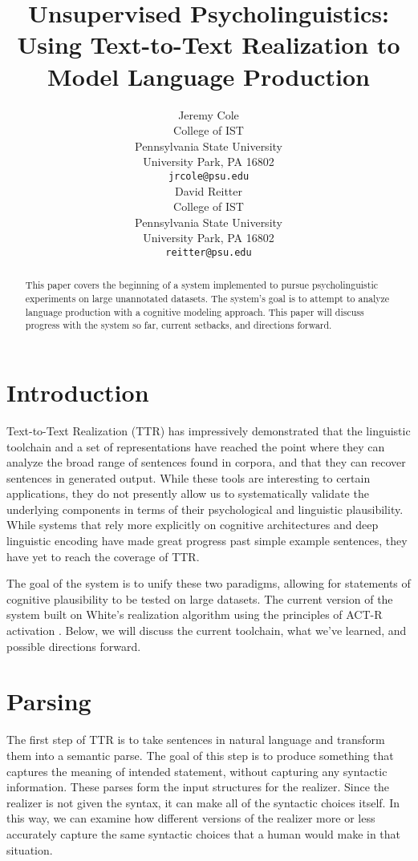 \documentclass[11pt]{article}
\title{Unsupervised Psycholinguistics: Using Text-to-Text Realization to Model Language Production}
\author{Jeremy Cole \\
  College of IST \\
  Pennsylvania State University \\
  University Park, PA 16802 \\ 
  {\tt jrcole@psu.edu} \\\And
  David Reitter \\
  College of IST \\
  Pennsylvania State University \\
  University Park, PA 16802 \\
  {\tt reitter@psu.edu} \\}
\date{}
\begin{document}
\maketitle
\begin{abstract}
This paper covers the beginning of a system implemented to pursue psycholinguistic experiments on large unannotated datasets. The system's goal is to attempt to analyze language production with a cognitive modeling approach. This paper will discuss progress with the system so far, current setbacks, and directions forward.
\end{abstract}

\section{Introduction}
Text-to-Text Realization (TTR) has impressively demonstrated that the linguistic toolchain and a set of representations have reached the point where they can analyze the broad range of sentences found in corpora, and that they can recover sentences in generated output. While these tools are interesting to certain applications, they do not presently allow us to systematically validate the underlying components in terms of their psychological and linguistic plausibility. While systems that rely more explicitly on cognitive architectures and deep linguistic encoding have made great progress past simple example sentences, they have yet to reach the coverage of TTR.

The goal of the system is to unify these two paradigms, allowing for statements of cognitive plausibility to be tested on large datasets. The current version of the system built on White's realization algorithm \cite{chart} using the principles of ACT-R activation \cite{actr}. Below, we will discuss the current toolchain, what we've learned, and possible directions forward.

\section{Parsing}
The first step of TTR is to take sentences in natural language and transform them into a semantic parse. The goal of this step is to produce something that captures the meaning of intended statement, without capturing any syntactic information. These parses form the input structures for the realizer. Since the realizer is not given the syntax, it can make all of the syntactic choices itself. In this way, we can examine how different versions of the realizer more or less accurately capture the same syntactic choices that a human would make in that situation.
\end{document}
